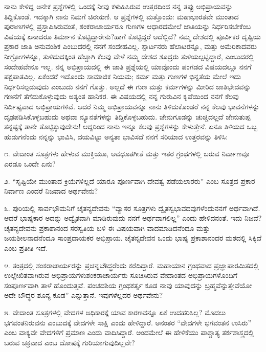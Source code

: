 ನಾನು ಕೇಳಿದ್ದ ಅನೇಕ ಪ್ರಶ್ನೆಗಳಲ್ಲಿ ಒಂದಕ್ಕೆ ನೀವು ಕಳುಹಿಸಿರುವ ಉತ್ತರದಿಂದ ನನ್ನ ತಪ್ಪು ಅಭಿಪ್ರಾಯವನ್ನು ತಿದ್ದಿಕೊಂಡೆ. ಇದಕ್ಕಾಗಿ ನಾನು ನಿಮಗೆ ಚಿರಋಣಿ. ಆ ಪ್ರಶ್ನೆಗಳಲ್ಲಿ ಮತ್ತೊಂದು: ಮಹಾಭಾರತವೇ ಮುಂತಾದ ಪುರಾಣಗಳಲ್ಲಿ ಪ್ರಸ್ತಾಪಿಸಿರುವಂತೆ, ಶಂಕರಾಚಾರ್ಯರೂ ಗುಣಗಳ ಆಧಾರದಮೇಲೆ ಜಾತಿಯನ್ನು ನಿರ್ಧರಿಸಬೇಕೆಂಬ ವಿಷಯಕ್ಕೆ ಏನಾದರೂ ತಿರ್ಮಾನ ಕೊಟ್ಟಿದ್ದಾರೇನು?ಹಾಗೆ ಕೊಟ್ಟಿದ್ದರೆ ಅದೆಲ್ಲಿದೆ? ನಮ್ಮ ದೇಶದಲ್ಲಿ ಪೂರ್ವಿಕರ ದೃಷ್ಟಿಯ ಪ್ರಕಾರ ಜಾತಿ ಅನುವಂಶಿಕ ಎಂಬುದರಲ್ಲಿ ನನಗೆ ಸಂದೇಹವಿಲ್ಲ. ಸ್ಪಾರ್ಟನರು ಹೆಲಾಟರನ್ನೂ, ಮತ್ತು ಅಮೆರಿಕಾದವರು ನೀಗ್ರೋಗಳನ್ನೂ, ತುಳಿದುದಕ್ಕಿಂತ ಹೆಚ್ಚಾಗಿ ಕೆಲವು ವೇಳೆ ನಮ್ಮ ದೇಶದ ಶೂದ್ರರು ತುಳಿಯಲ್ಪಟ್ಟಿದ್ದಾರೆ, ಎಂಬುದರಲ್ಲಿ ಸಂದೇಹವೇನೂ ಇಲ್ಲ. ನನ್ನ ಅಭಿಪ್ರಾಯದಲ್ಲಿ ಈ ಜಾತಿ ಪ್ರಶ್ನೆಯಲ್ಲಿ ಯಾವೊಂದು ಪಂಗಡದ ವಿಷಯದಲ್ಲೂ ನನಗೆ ಪಕ್ಷಪಾತವಿಲ್ಲ. ಏಕೆಂದರೆ ಇದೊಂದು ಸಾಮಾಜಿಕ ನಿಯಮ; ಕರ್ಮ ಮತ್ತು ಗುಣಗಳ ಭಿನ್ನತೆಯ ಮೇಲೆ ಇದು ನಿರ್ಧರಿಸಲ್ಪಡುವುದು ಎಂಬುದು ನನಗೆ ಗೊತ್ತು. ಅಲ್ಲದೆ ಈ ಗುಣ ಮತ್ತು ಕರ್ಮಗಳನ್ನು ಮೀರಿದ ಜಾತಿಭೇದವನ್ನು ಗಣನೆಗೆ ತೆಗೆದುಕೊಳ್ಳುವುದು ಅತ್ಯಂತ ಹಾನಿಕರ. ಈ ವಿಷಯದಲ್ಲಿ ನನ್ನ ಗುರುವಿನ ಕೃಪೆಯಿಂದ ನನಗೆ ಕೆಲವು ನಿರ್ದಿಷ್ಟವಾದ ಅಭಿಪ್ರಾಯಗಳಿವೆ. ಆದರೆ ನಿಮ್ಮ ಅಭಿಪ್ರಾಯವನ್ನೂ ನಾನು ತಿಳಿದುಕೊಂಡರೆ ನನ್ನ ಕೆಲವು ಭಾವನೆಗಳನ್ನು ದೃಢಪಡಿಸಿಕೊಳ್ಳಬಹುದು ಅಥವಾ ನ್ಯೂನತೆಗಳನ್ನು ತಿದ್ದಿಕೊಳ್ಳಬಹುದು. ಜೇನುಗೂಡನ್ನು ಚುಚ್ಚಿದಲ್ಲದೆ ಜೇನುತುಪ್ಪ ತನ್ನಷ್ಟಕ್ಕೆ ತಾನೇ ತೊಟ್ಟಿಕ್ಕುವುದೇನು! ಆದ್ದರಿಂದ ನಾನು ಇನ್ನೂ ಕೆಲವು ಪ್ರಶ್ನೆಗಳನ್ನು ಕೇಳುತ್ತೇನೆ. ಏನೂ ತಿಳಿಯದ ಒಬ್ಬ ಹುಡುಗನೆಂದು ನನ್ನನ್ನು ಭಾವಿಸಿ, ದಯವಿಟ್ಟು ಅನ್ಯತಾ ಭಾವಿಸದೆ ನನಗೆ ಸರಿಯಾದ ಉತ್ತರವನ್ನು ತಿಳಿಸಿ:

೧. ವೇದಾಂತ ಸೂತ್ರಗಳು ಹೇಳುವ ಮುಕ್ತಿಯೂ, ಅವಧೂತಗೀತೆ ಮತ್ತು ಇತರ ಗ್ರಂಥಗಳಲ್ಲಿ ಬರುವ ನಿರ್ವಾಣವೂ ಎರಡೂ ಒಂದೇ ಏನು?

೨. “ಸೃಷ್ಟಿಯೇ ಮುಂತಾದ ಕ್ರಿಯೆಗಳಿಲ್ಲದೆ ಯಾರೂ ಪೂರ್ಣವಾಗಿ ದೇವತ್ವ ಪಡೆಯಲಾರರು” ಎಂಬ ಸೂತ್ರದ ಪ್ರಕಾರ ನಿರ್ವಾಣ ಎಂದರೆ ನಿಜವಾದ ಅರ್ಥವೇನು?

೩. ಪುರಿಯಲ್ಲಿ ಸಾರ್ವಭೌಮನಿಗೆ ಚೈತನ್ಯದೇವನು “ವ್ಯಾಸರ ಸೂತ್ರಗಳು ದ್ವೈತಸ್ವಭಾವದವುಗಳೆಂದುನನಗೆ ಅರ್ಥವಾಗಿದೆ. ಆದರೆ ಭಾಷ್ಯಕಾರ ಅದನ್ನು ಅದ್ವೈತವಾಗಿ ಮಾಡಿರುವುದು ನನಗೆ ಅರ್ಥವಾಗಲಿಲ್ಲ” ಎಂದು ಹೇಳಿದನಂತೆ. ಇದು ನಿಜವೆ? ಚೈತನ್ಯದೇವನು ಪ್ರಕಾಶಾನಂದ ಸರಸ್ವತಿಯ ಬಳಿ ಈ ವಿಷಯವಾಗಿ ವಾದಮಾಡಿದನೆಂದೂ ಮತ್ತು ಜಯಶೀಲನಾದನೆಂದೂ ಸಾಂಪ್ರದಾಯಕರ ಅಭಿಪ್ರಾಯ. ಚೈತನ್ಯದೇವನ ಒಂದು ಭಾಷ್ಯ ಪ್ರಕಾಶಾನಂದರ ಮಠದಲ್ಲಿ ಸಿಕ್ಕಿದೆ ಎಂಬ ಪ್ರತೀತಿ ಇದೆ.

೪. ತಂತ್ರದಲ್ಲಿ ಶಂಕರಾಚಾರ್ಯರನ್ನು ಪ್ರಚನ್ನಬೌದ್ಧರೆಂದು ಕರೆದಿದ್ದಾರೆ. ಮಹಾಯಾನ ಗ್ರಂಥವಾದ ಪ್ರಜ್ಞಾಪಾರಮಿತದಲ್ಲಿ ಉಲ್ಲೇಖಿತವಾಗಿರುವ ಅಭಿಪ್ರಾಯಗಳು\break ಶಂಕರಾಚಾರ್ಯರು ಸೂಚಿಸಿರುವ ವೇದಾಂತದ ಅಭಿಪ್ರಾಯಗಳೊಂದಿಗೆ ಸಂಪೂರ್ಣವಾಗಿ ತಾಳೆ ಹೊಂದುತ್ತವೆ. ಪಂಚದಶಿಯ ಗ್ರಂಥಕರ್ತೃ ಕೂಡ ನಾವು ಯಾವುದನ್ನು ಬ್ರಹ್ಮವೆನ್ನುತ್ತೇವೆಯೋ ಅದೇ ಬೌದ್ಧರ ಶೂನ್ಯ ಕೂಡ'' ಎನ್ನುತ್ತಾನೆ. ಇವುಗಳೆಲ್ಲದರ ಅರ್ಥವೇನು?

೫. ವೇದಾಂತ ಸೂತ್ರಗಳಲ್ಲಿ ವೇದಗಳ ಅಧಿಕಾರಕ್ಕೆ ಯಾವ ಕಾರಣವನ್ನೂ ಏಕೆ ಉದಹರಿಸಿಲ್ಲ? ಮೊದಲು ಭಗವಂತನಿರುವನು ಎಂಬುದಕ್ಕೆ ವೇದಗಳೇ ಸಾಕ್ಷಿ ಎಂದು ಹೇಳಿದ್ದಾರೆ. ಅನಂತರ “ವೇದಗಳೇ ಭಗವಂತನ ಉಸಿರು” ಎಂಬ ವಾಕ್ಯವೇ ವೇದಗಳಿಗೆ ಪ್ರಮಾಣ ಎಂದು ವಾದಿಸಿದ್ದಾರೆ. ಅಂದಮೇಲೆ ಈ ಹೇಳಿಕೆಯು ಪಾಶ್ಚಾತ್ಯ ತರ್ಕಶಾಸ್ತ್ರದಲ್ಲಿ ಬರುವ ಚಕ್ರವಾದ ಎಂಬ ದೋಷಕ್ಕೆ ಗುರಿಯಾಗುವುದಿಲ್ಲವೇ?

